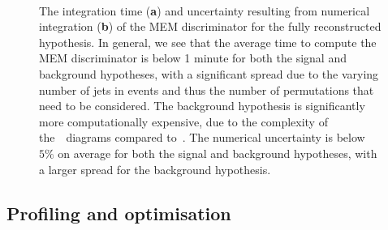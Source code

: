 \begin{figure}
\begin{centering}
\\
\caption[The MEM integration time.]{The integration time (\textbf{a}) and uncertainty resulting from numerical integration (\textbf{b}) of the MEM discriminator for the fully reconstructed hypothesis. In general, we see that the average time to compute the MEM discriminator is below 1 minute for both the signal and background hypotheses, with a significant spread due to the varying number of jets in events and thus the number of permutations that need to be considered. The background hypothesis is significantly more computationally expensive, due to the complexity of the~\ttbb~diagrams compared to~\ttHbb. The numerical uncertainty is below~$5\%$ on average for both the signal and background hypotheses, with a larger spread for the background hypothesis.}
\label{fig:mem_numerical_accuracy}
\end{centering}
\end{figure}

\subsection{Profiling and optimisation}
\label{sec:mem_optimization}

